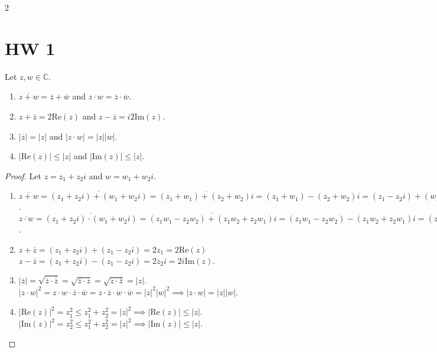 \documentclass{article}
\begin{document}
\begin{multicols}{2}

\section{HW 1}

\begin{exersise}
[Lemma 1.2]
Let $z,w\in \mathbb{C}$.
\begin{enumerate}[label={(\alph*)}]
\item $\overline{z+w}=\overline{z}+\overline{w}$ and $\overline{z\cdot w}=\overline{z}\cdot \overline{w}$.
\item $z+\overline{z}=2\text{Re}(z)$ and $z-\overline{z}=i2\text{Im}(z)$.
\item $|\overline{z}|=|z|$ and $|z\cdot w|=|z||w|$.
\item $|\text{Re}(z)|\leq |z|$ and $|\text{Im}(z)|\leq |z|$.
\end{enumerate}
\end{exersise}
\begin{proof}
Let $z=z_1+z_2i$ and $w=w_1+w_2i$.
\begin{enumerate}[label={(\alph*)}]
\item $\overline{z+w}=\overline{(z_1+z_2i)+(w_1+w_2i)}=\overline{(z_1+w_1)+(z_2+w_2)i}=(z_1+w_1)-(z_2+w_2)i=(z_1-z_2i)+(w_1-w_2i)=\overline{z}+\overline{w}$.\\
$\overline{z\cdot w}=\overline{(z_1+z_2i)\cdot(w_1+w_2i)}=\overline{(z_1w_1-z_2w_2)+(z_1w_2+z_2w_1)i}=(z_1w_1-z_2w_2)-(z_1w_2+z_2w_1)i=(z_1-z_2i)\cdot (w_1-w_2i)=\overline{z}\cdot \overline{w}$.
\item $z+\overline{z}=(z_1+z_2i)+(z_1-z_2i)=2z_1=2\text{Re}(z)$\\
$z-\overline{z}=(z_1+z_2i)-(z_1-z_2i)=2z_2i=2i\text{Im}(z)$.
\item $|\overline{z}|=\sqrt{\overline{z}\cdot \overline{\overline{z}}}=\sqrt{\overline{z}\cdot z}=\sqrt{z\cdot \overline{z}}=|z|$.\\
$|z\cdot w|^2 = z\cdot w\cdot \overline{z}\cdot \overline{w} = z\cdot \overline{z}\cdot w\cdot \overline{w} = |z|^2|w|^2 \implies |z\cdot w|=|z||w|$.
\item $|\text{Re}(z)|^2=z_1^2 \leq z_1^2+z_2^2 = |z|^2 \implies |\text{Re}(z)|\leq |z|$.\\
$|\text{Im}(z)|^2=z_2^2 \leq z_1^2+z_2^2 = |z|^2 \implies |\text{Im}(z)|\leq |z|$.
\end{enumerate}
\end{proof}


\end{multicols}
\end{document}

